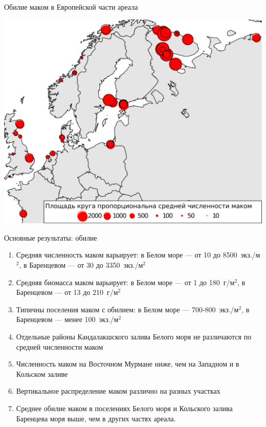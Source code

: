 \documentclass{beamer}
\begin{document}
\begin{frame}{Обилие маком в Европейской части ареала}
 \begin{center}
		\includegraphics[width=.9\textwidth]{Nmean_1.pdf}
 \end{center}
\end{frame}


\begin{frame}{Основные результаты: обилие}
		\begin{enumerate}
			\item Средняя численность маком варьирует: в Белом море --- от 10 до 8500~экз./м$^2$, в Баренцевом --- от 30 до 3350~экз./м$^2$
			\item Средняя биомасса маком варьирует: в Белом море --- от 1 до 180~г/м$^2$,  в Баренцевом --- от 13 до 210~г/м$^2$
			\item Типичны поселения маком с обилием: в Белом море ---  700-800~экз./м$^2$, в Баренцевом --- менее 100~экз./м$^2$
			\item Отдельные районы Кандалакшского залива Белого моря не различаются по средней численности маком
			\item Численность маком на Восточном Мурмане ниже, чем на Западном и в Кольском заливе
			\item Вертикальное распределение маком различно на разных участках
			\item Среднее обилие маком в поселениях Белого моря и Кольского залива Баренцева моря выше, чем в других частях ареала. 
		\end{enumerate}
\end{frame}
\end{document}
